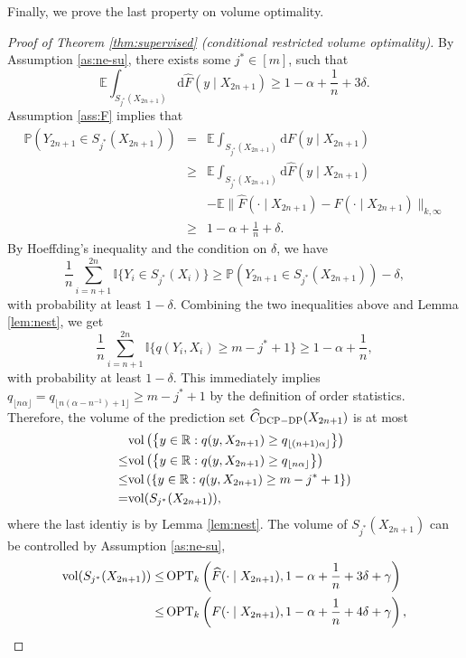 Finally, we prove the last property on volume optimality.
\begin{proof}[Proof of Theorem \ref{thm:supervised} (conditional restricted volume optimality)]
By Assumption \ref{as:ne-su}, there exists some $j^*\in[m]$, such that
$$\mathbb{E}\int_{S_{j^*}(X_{2n+1})} \mathrm{d}\widehat{F}(y \mid X_{2n+1})\geq 1-\alpha+\frac{1}{n}+3\delta.$$
Assumption \ref{ass:F} implies that 
\begin{eqnarray*}
\mathbb{P}\left(Y_{2n+1}\in S_{j^*}(X_{2n+1})\right) 
&=& \mathbb{E}\int_{S_{j^*}(X_{2n+1})} \mathrm{d}F(y\mid X_{2n+1}) \\
&\geq& \mathbb{E}\int_{S_{j^*}(X_{2n+1})} \mathrm{d}\widehat{F}(y\mid X_{2n+1})\\
&& - \mathbb{E}\|\widehat{F}(\cdot \mid X_{2n+1})-F(\cdot\mid X_{2n+1})\|_{k,\infty}\\
&\geq& 1-\alpha+\frac{1}{n}+\delta.
\end{eqnarray*}
By Hoeffding's inequality and the condition on $\delta$, we have
$$\frac{1}{n}\sum_{i=n+1}^{2n}\mathbb{I}\{Y_i\in S_{j^*}(X_i)\}\geq \mathbb{P}\left(Y_{2n+1}\in S_{j^*}(X_{2n+1})\right)-\delta,$$
with probability at least $1-\delta$.
Combining the two inequalities above and Lemma \ref{lem:nest}, we get
$$\frac{1}{n}\sum_{i=n+1}^{2n}\mathbb{I}\{q(Y_i,X_i)\geq m-j^*+1\}\geq 1-\alpha+\frac{1}{n},$$
with probability at least $1-\delta$.
This immediately implies $q_{\lfloor n\alpha\rfloor}=q_{\lfloor n(\alpha-n^{-1})+1\rfloor}\geq m-j^*+1$ by the definition of order statistics. Therefore, the volume of the prediction set $\widehat{C}_{\rm DCP-DP}(X_{2n+1})$ is at most
\begin{align*}
&\mathrm{vol}\left(\left\{y\in\mathbb{R}: q(y,X_{2n+1})\geq q_{\lfloor(n+1)\alpha\rfloor}\right\}\right) \\
\leq& \mathrm{vol}\left(\left\{y\in\mathbb{R}: q(y,X_{2n+1})\geq q_{\lfloor n\alpha\rfloor}\right\}\right) \\
\leq& \mathrm{vol}\left(\left\{y\in\mathbb{R}: q(y,X_{2n+1})\geq m-j^*+1\right\}\right) \\
=& \mathrm{vol}(S_{j^*}(X_{2n+1})),
\end{align*}
where the last identiy is by Lemma \ref{lem:nest}.
The volume of $S_{j^*}(X_{2n+1})$ can be controlled by Assumption \ref{as:ne-su},
\begin{align*}
    \vol(S_{j^*}(X_{2n+1})) \leq& \opt_k\left(\widehat{F}(\cdot\mid X_{2n+1}),1-\alpha+\frac{1}{n}+3\delta+\gamma\right) \\
\leq& \opt_k\left(F(\cdot\mid X_{2n+1}),1-\alpha+\frac{1}{n}+4\delta+\gamma\right),

\end{align*}
\end{proof}
